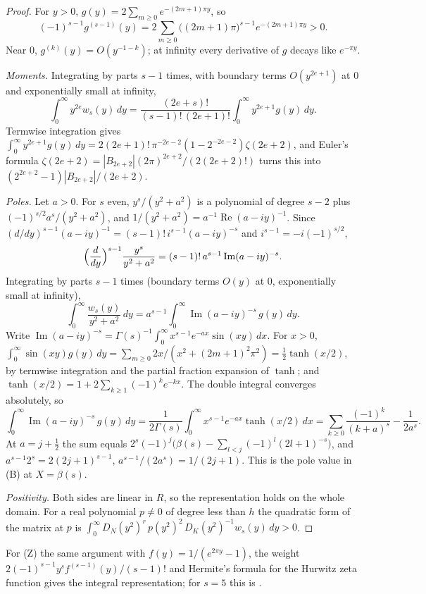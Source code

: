 \documentclass[11pt]{article}
\theoremstyle{definition}
\begin{document}
\begin{proof}
For $y>0$, $g(y)=2\sum_{m\ge0}e^{-(2m+1)\pi y}$, so
\[
(-1)^{s-1}g^{(s-1)}(y)=2\sum_{m\ge0}\bigl((2m+1)\pi\bigr)^{s-1}e^{-(2m+1)\pi y}>0.
\] Near $0$, $g^{(k)}(y)=O(y^{-1-k})$; at infinity every derivative of $g$ decays like $e^{-\pi y}$.

\emph{Moments.} Integrating by parts $s-1$ times, with boundary terms $O(y^{2e+1})$ at $0$ and exponentially small at infinity,
\[
\int_0^\infty y^{2e}w_s(y)\,dy=\frac{(2e+s)!}{(s-1)!\,(2e+1)!}\int_0^\infty y^{2e+1}g(y)\,dy .
\]
Termwise integration gives $\int_0^\infty y^{2e+1}g(y)\,dy=2(2e+1)!\,\pi^{-2e-2}(1-2^{-2e-2})\zeta(2e+2)$, and Euler's formula $\zeta(2e+2)=|B_{2e+2}|(2\pi)^{2e+2}/(2(2e+2)!)$ turns this into $(2^{2e+2}-1)|B_{2e+2}|/(2e+2)$.

\emph{Poles.} Let $a>0$. For $s$ even, $y^s/(y^2+a^2)$ is a polynomial of degree $s-2$ plus $(-1)^{s/2}a^s/(y^2+a^2)$, and $1/(y^2+a^2)=a^{-1}\operatorname{Re}(a-iy)^{-1}$. Since $(d/dy)^{s-1}(a-iy)^{-1}=(s-1)!\,i^{s-1}(a-iy)^{-s}$ and $i^{s-1}=-i(-1)^{s/2}$,
\[
\Bigl(\frac{d}{dy}\Bigr)^{s-1}\frac{y^s}{y^2+a^2}=(s-1)!\,a^{s-1}\operatorname{Im}(a-iy)^{-s}.
\]
Integrating by parts $s-1$ times (boundary terms $O(y)$ at $0$, exponentially small at infinity),
\[
\int_0^\infty\frac{w_s(y)}{y^2+a^2}\,dy=a^{s-1}\int_0^\infty\operatorname{Im}(a-iy)^{-s}\,g(y)\,dy .
\]
Write $\operatorname{Im}(a-iy)^{-s}=\Gamma(s)^{-1}\int_0^\infty x^{s-1}e^{-ax}\sin(xy)\,dx$. For $x>0$, $\int_0^\infty\sin(xy)g(y)\,dy=\sum_{m\ge0}2x/(x^2+(2m+1)^2\pi^2)=\frac12\tanh(x/2)$, by termwise integration and the partial fraction expansion of $\tanh$; and $\tanh(x/2)=1+2\sum_{k\ge1}(-1)^ke^{-kx}$. The double integral converges absolutely, so
\[
\int_0^\infty\operatorname{Im}(a-iy)^{-s}\,g(y)\,dy=\frac1{2\Gamma(s)}\int_0^\infty x^{s-1}e^{-ax}\tanh(x/2)\,dx=\sum_{k\ge0}\frac{(-1)^k}{(k+a)^s}-\frac1{2a^s}.
\]
At $a=j+\frac12$ the sum equals $2^s(-1)^j\bigl(\beta(s)-\sum_{l<j}(-1)^l(2l+1)^{-s}\bigr)$, and $a^{s-1}2^s=2(2j+1)^{s-1}$, $a^{s-1}/(2a^s)=1/(2j+1)$. This is the pole value in (B) at $X=\beta(s)$.

\emph{Positivity.} Both sides are linear in $R$, so the representation holds on the whole domain. For a real polynomial $p\ne0$ of degree less than $h$ the quadratic form of the matrix at $p$ is $\int_0^\infty D_N(y^2)^r\,p(y^2)^2\,D_K(y^2)^{-1}w_s(y)\,dy>0$.
\end{proof}

For (Z) the same argument with $f(y)=1/(e^{2\pi y}-1)$, the weight $2(-1)^{s-1}y^sf^{(s-1)}(y)/(s-1)!$ and Hermite's formula for the Hurwitz zeta function \cite[25.11.29]{DLMF} gives the integral representation; for $s=5$ this is \cite[Proposition~2.2]{Fauzan}.
\end{document}
